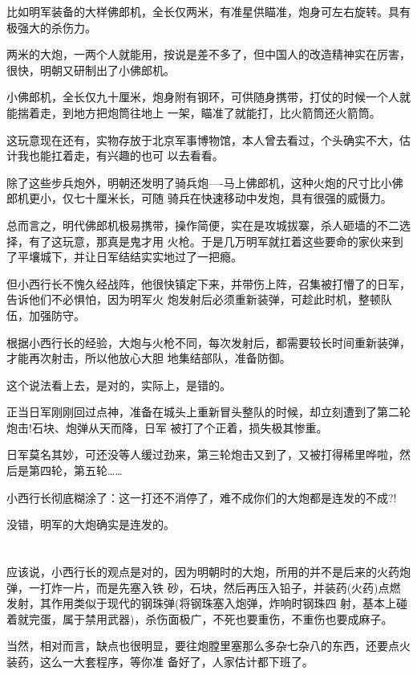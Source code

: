 \documentclass[11pt,a4paper,onecolumn]{article}
\begin{document}
比如明军装备的大样佛郎机，全长仅两米，有准星供瞄准，炮身可左右旋转。具有极强大的杀伤力。

两米的大炮，一两个人就能用，按说是差不多了，但中国人的改造精神实在厉害，很快，明朝又研制出了小佛郎机。

小佛郎机，全长仅九十厘米，炮身附有钢环，可供随身携带，打仗的时候一个人就能揣着走，到地方把炮筒往地上
一架，瞄准了就能打，比火箭筒还火箭筒。

这玩意现在还有，实物存放于北京军事博物馆，本人曾去看过，个头确实不大，估计我也能扛着走，有兴趣的也可
以去看看。

除了这些步兵炮外，明朝还发明了骑兵炮----马上佛郎机，这种火炮的尺寸比小佛郎机更小，仅七十厘米长，可随
骑兵在快速移动中发炮，具有很强的威慑力。

总而言之，明代佛郎机极易携带，操作简便，实在是攻城拔寨，杀人砸墙的不二选择，有了这玩意，那真是鬼才用
火枪。于是几万明军就扛着这些要命的家伙来到了平壤城下，并让日军结结实实地过了一把瘾。

但小西行长不愧久经战阵，他很快镇定下来，并带伤上阵，召集被打懵了的日军，告诉他们不必惧怕，因为明军火
炮发射后必须重新装弹，可趁此时机，整顿队伍，加强防守。

根据小西行长的经验，大炮与火枪不同，每次发射后，都需要较长时间重新装弹，才能再次射击，所以他放心大胆
地集结部队，准备防御。

这个说法看上去，是对的，实际上，是错的。

正当日军刚刚回过点神，准备在城头上重新冒头整队的时候，却立刻遭到了第二轮炮击!石块、炮弹从天而降，日军
被打了个正着，损失极其惨重。

日军莫名其妙，可还没等人缓过劲来，第三轮炮击又到了，又被打得稀里哗啦，然后是第四轮，第五轮……

小西行长彻底糊涂了：这一打还不消停了，难不成你们的大炮都是连发的不成?!

没错，明军的大炮确实是连发的。

\section[\thesection]{}

应该说，小西行长的观点是对的，因为明朝时的大炮，所用的并不是后来的火药炮弹，一打炸一片，而是先塞入铁
砂，石块，然后再压入铅子，并装药(火药)点燃发射，其作用类似于现代的钢珠弹(将钢珠塞入炮弹，炸响时钢珠四
射，基本上碰着就完蛋，属于禁用武器)，杀伤面极广，不死也要重伤，不重伤也要成麻子。

当然，相对而言，缺点也很明显，要往炮膛里塞那么多杂七杂八的东西，还要点火装药，这么一大套程序，等你准
备好了，人家估计都下班了。
\end{document}
